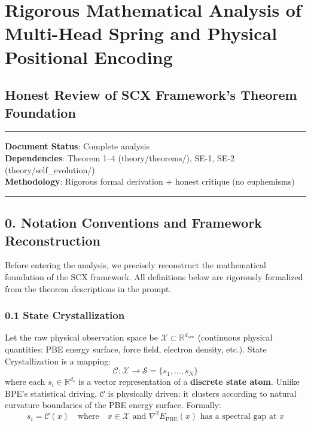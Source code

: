 \documentclass[
  12pt,
]{article}
\author{SCX}
\date{2026}
\begin{document}
\section{Rigorous Mathematical Analysis of Multi-Head Spring and Physical Positional Encoding}\label{multi-head-spring-and-ppe-analysis}

\subsection{Honest Review of SCX Framework's Theorem Foundation}\label{honest-review-scx-framework}

\begin{center}\rule{0.5\linewidth}{0.5pt}\end{center}

\textbf{Document Status}: Complete analysis\\
\textbf{Dependencies}: Theorem 1--4 (theory/theorems/), SE-1, SE-2 (theory/self\_evolution/)\\
\textbf{Methodology}: Rigorous formal derivation + honest critique (no euphemisms)

\begin{center}\rule{0.5\linewidth}{0.5pt}\end{center}

\subsection{0. Notation Conventions and Framework Reconstruction}\label{notation-conventions}

Before entering the analysis, we precisely reconstruct the mathematical foundation of the SCX framework. All definitions below are rigorously formalized from the theorem descriptions in the prompt.

\subsubsection{0.1 State Crystallization}\label{state-crystallization}

Let the raw physical observation space be $\mathcal{X} \subset \mathbb{R}^{d_{\text{raw}}}$ (continuous physical quantities: PBE energy surface, force field, electron density, etc.). State Crystallization is a mapping:
\[\mathcal{C}: \mathcal{X} \to \mathcal{S} = \{s_1, \ldots, s_N\}\]
where each $s_i \in \mathbb{R}^{d_s}$ is a vector representation of a \textbf{discrete state atom}. Unlike BPE's statistical driving, $\mathcal{C}$ is physically driven: it clusters according to natural curvature boundaries of the PBE energy surface. Formally:
\[s_i = \mathcal{C}(x) \quad \text{where} \quad x \in \mathcal{X} \text{ and } \nabla^2 E_{\text{PBE}}(x) \text{ has a spectral gap at } x\]
\end{document}
